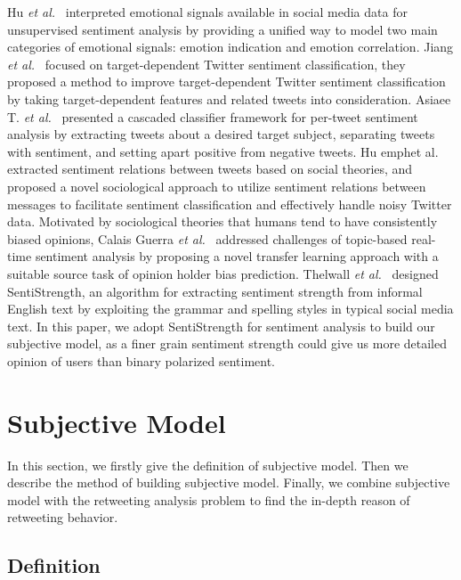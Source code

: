 \documentclass{acm_proc_article-sp}
\newcommand{\mo}[1]{\textcolor{red}{#1}}
\begin{document}
Hu \emph{et al.}~\cite{Hu:2013www} interpreted emotional signals available in social media data for unsupervised sentiment analysis by providing a unified way to model two main categories of emotional signals: emotion indication and emotion correlation. 
Jiang \emph{et al.}~\cite{Jiang:2011TTS} focused on target-dependent Twitter sentiment classification, they proposed a method to improve target-dependent Twitter sentiment classification by taking target-dependent features and related tweets into consideration. 
Asiaee T. \emph{et al.}~\cite{AsiaeeT:2012} presented a cascaded classifier framework for per-tweet sentiment analysis by extracting tweets about a desired target subject, separating tweets with sentiment, and setting apart positive from negative tweets.
Hu emph{et al.}~\cite{Hu:2013ESR} extracted sentiment relations between tweets based on social theories, and proposed a novel sociological approach to utilize sentiment relations between messages to facilitate sentiment classification and effectively handle noisy Twitter data.
Motivated by sociological theories that humans tend to have consistently biased opinions, Calais Guerra \emph{et al.}~\cite{CalaisGuerra:2011BOT} addressed challenges of topic-based real-time sentiment analysis by proposing a novel transfer learning approach with a suitable source task of opinion holder bias prediction.
Thelwall \emph{et al.}~\cite{Thelwall:2010SSS,Thelwall:2012SSD} designed SentiStrength, an algorithm for extracting sentiment strength from informal English text by exploiting the grammar and spelling styles in typical social media text.
In this paper, we adopt SentiStrength for sentiment analysis to build our subjective model, as a finer grain sentiment strength could give us more detailed opinion of users than binary polarized sentiment.

\section{Subjective Model}
\label{subjectivemodel}
In this section, we firstly give the definition of subjective model. Then we describe the method of building subjective model. Finally, we combine subjective model with the retweeting analysis problem to find the in-depth reason of retweeting behavior.
\subsection{Definition}
\label{definition}
\end{document}
